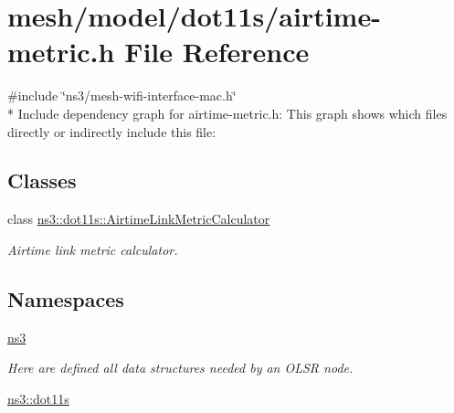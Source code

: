\hypertarget{airtime-metric_8h}{}\section{mesh/model/dot11s/airtime-\/metric.h File Reference}
\label{airtime-metric_8h}
{\ttfamily \#include \char`\"{}ns3/mesh-\/wifi-\/interface-\/mac.\+h\char`\"{}}\\*
Include dependency graph for airtime-\/metric.h\+:
This graph shows which files directly or indirectly include this file\+:
\subsection*{Classes}
\begin{DoxyCompactItemize}
\item 
class \hyperlink{classns3_1_1dot11s_1_1AirtimeLinkMetricCalculator}{ns3\+::dot11s\+::\+Airtime\+Link\+Metric\+Calculator}
\begin{DoxyCompactList}\small\item\em Airtime link metric calculator. \end{DoxyCompactList}\end{DoxyCompactItemize}
\subsection*{Namespaces}
\begin{DoxyCompactItemize}
\item 
 \hyperlink{namespacens3}{ns3}
\begin{DoxyCompactList}\small\item\em Here are defined all data structures needed by an O\+L\+SR node. \end{DoxyCompactList}\item 
 \hyperlink{namespacens3_1_1dot11s}{ns3\+::dot11s}
\end{DoxyCompactItemize}
